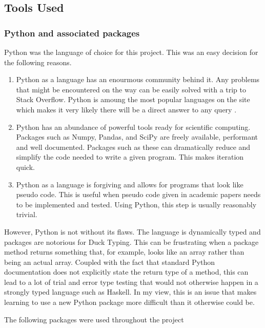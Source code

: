 \documentclass{report}
\begin{document}
\subsection{Tools Used}
\subsubsection{Python and associated packages}

Python was the language of choice for this project. This was an easy decision for the following reasons.

\begin{enumerate}
  \item Python as a language has an enourmous community behind it. Any problems that might be encountered on the way can be easily solved with a trip to Stack Overflow. Python is amoung the most popular languages on the site which makes it very likely there will be a direct answer to any query \cite{website:redmonk-languages}. 
  
  \item Python has an abundance of powerful tools ready for scientific computing. Packages such as Numpy, Pandas, and SciPy are freely available, performant and well documented. Packages such as these can dramatically reduce and simplify the code needed to write a given program. This makes iteration quick.

  \item Python as a language is forgiving and allows for programs that look like pseudo code. This is useful when pseudo code given in academic papers needs to be implemented and tested. Using Python, this step is usually reasonably trivial.

\end{enumerate}


However, Python is not without its flaws. The language is dynamically typed and packages are notorious for Duck Typing. This can be frustrating when a package method returns something that, for example, looks like an array rather than being an actual array. Coupled with the fact that standard Python documentation does not explicitly state the return type of a method, this can lead to a lot of trial and error type testing that would not otherwise happen in a strongly typed language such as Haskell. In my view, this is an issue that makes learning to use a new Python package more difficult than it otherwise could be.


\noindent The following packages were used throughout the project
\end{document}

